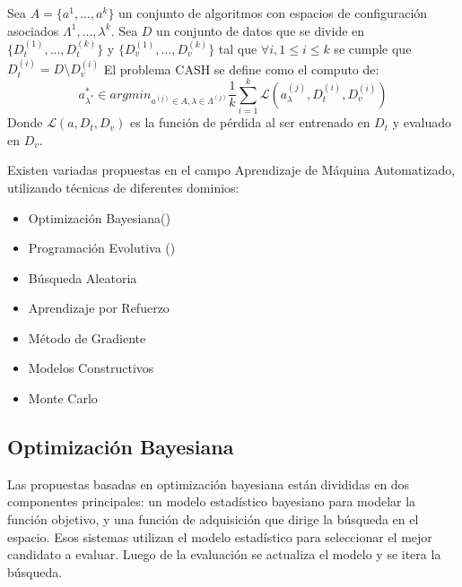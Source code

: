 \begin{definition}
    Sea $A = \{a^1, ..., a^k\}$  un conjunto de algoritmos con espacios de configuraci\'on asociados $\Lambda^1, ..., \lambda^k$.
    Sea $D$ un conjunto de datos  que se divide en $\{D_{t}^{(1)},..., D_{t}^{(k)}\}$ y $\{D_{v}^{(1)},..., D_{v}^{(k)}\}$ 
    tal que $\forall i, 1 \leq i \leq k$ se cumple que $D_{t}^{(i)} = D \setminus D^{(i)}_{v}$
    El problema CASH se define como el computo de:
    \begin{equation*}
        a^*_{\lambda^*} \in argmin_{a^{(j)} \in A, \lambda \in \Lambda^{(j)}} \frac{1}{k} \sum^{k}_{i = 1}\mathcal{L}(a^(j)_\lambda, D^{(i)}_t, D^{(i)}_v)
    \end{equation*}
    Donde $\mathcal{L}(a, D_t, D_v)$ es la funci\'on de p\'erdida al ser entrenado en $D_t$ y evaluado en $D_v$.
\end{definition}



Existen variadas propuestas en el campo Aprendizaje de M\'aquina Automatizado, utilizando t\'ecnicas de diferentes dominios:
\begin{itemize}
    \item Optimizaci\'on Bayesiana(\cite{hutter2019automated})
    \item Programaci\'on Evolutiva (\cite{chen2018autostacker})
    \item B\'usqueda Aleatoria 
    \item Aprendizaje por Refuerzo
    \item M\'etodo de Gradiente
    \item Modelos Constructivos
    \item Monte Carlo
\end{itemize}

\subsection{Optimizaci\'on Bayesiana}
Las propuestas basadas en optimizaci\'on bayesiana est\'an divididas en dos componentes principales: un modelo estad\'istico bayesiano para modelar la funci\'on objetivo, y una funci\'on de adquisici\'on que dirige la b\'usqueda en el espacio. Esos sistemas utilizan el modelo estad\'istico para seleccionar el mejor candidato a evaluar. Luego de la evaluaci\'on se actualiza el modelo y se itera la b\'usqueda.

